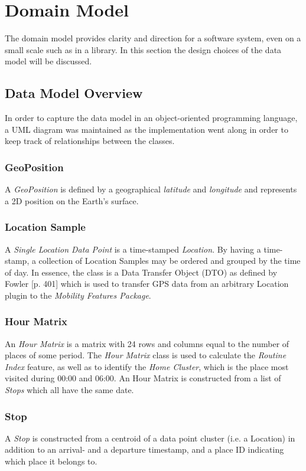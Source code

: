 \section{Domain Model}
The domain model provides clarity and direction for a software system, even on a small scale such as in a library. In this section the design choices of the data model will be discussed.

\subsection{Data Model Overview}
In order to capture the data model in an object-oriented programming language, a UML diagram was maintained as the implementation went along in order to keep track of relationships between the classes. 

\subsubsection*{GeoPosition}
A \textit{GeoPosition} is defined by a geographical \textit{latitude} and \textit{longitude} and represents a 2D position on the Earth's surface.

\subsubsection*{Location Sample}
A \textit{Single Location Data Point} is a time-stamped \textit{Location}. By having a time-stamp, a collection of Location Samples may be ordered and grouped by the time of day. In essence, the class is a Data Transfer Object (DTO) as defined by Fowler \cite{fowler-PEEA} [p. 401] which is used to transfer GPS data from an arbitrary Location plugin to the \textit{Mobility Features Package}.

\subsubsection*{Hour Matrix}
An \textit{Hour Matrix} is a matrix with 24 rows and columns equal to the number of places of some period. The \textit{Hour Matrix} class is used to calculate the \textit{Routine Index} feature, as well as to identify the \textit{Home Cluster}, which is the place most visited during 00:00 and 06:00. An Hour Matrix is constructed from a list of \textit{Stops} which all have the same date.

\subsubsection*{Stop}
A \textit{Stop} is constructed from a centroid of a data point cluster (i.e. a Location) in addition to an arrival- and a departure timestamp, and a place ID indicating which place it belongs to.

